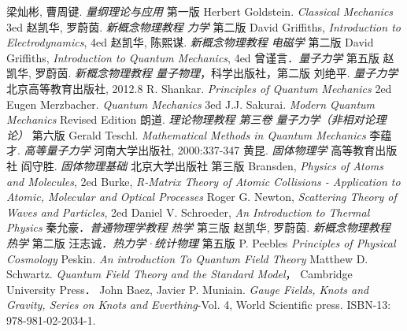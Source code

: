 \begin{thebibliography}{99}
梁灿彬, 曹周键. \textsl{量纲理论与应用} 第一版
Herbert Goldstein. \textsl{Classical Mechanics} 3ed
赵凯华, 罗蔚茵. \textsl{新概念物理教程 力学} 第二版
David Griffiths, \textsl{Introduction to Electrodynamics}, 4ed
赵凯华, 陈熙谋. \textsl{新概念物理教程 电磁学} 第二版
David Griffiths, \textsl{Introduction to Quantum Mechanics}, 4ed
曾谨言．\textsl{量子力学} 第五版
赵凯华, 罗蔚茵. \textsl{新概念物理教程 量子物理}，科学出版社，第二版
刘绝平. \textsl{量子力学} 北京高等教育出版社, 2012.8
R. Shankar. \textsl{Principles of Quantum Mechanics} 2ed
Eugen Merzbacher. \textsl{Quantum  Mechanics} 3ed
J.J. Sakurai. \textsl{Modern Quantum Mechanics} Revised Edition
朗道. \textsl{理论物理教程 第三卷 量子力学（非相对论理论）} 第六版
Gerald Teschl. \textsl{Mathematical Methods in Quantum Mechanics}
李蕴才. \textsl{高等量子力学} 河南大学出版社, 2000:337-347
黄昆. \textsl{固体物理学} 高等教育出版社
阎守胜. \textsl{固体物理基础} 北京大学出版社 第三版
Bransden, \textsl{Physics of Atoms and Molecules}, 2ed
Burke, \textsl{R-Matrix Theory of Atomic Collisions - Application to Atomic, Molecular and Optical Processes}
Roger G. Newton, \textsl{Scattering Theory of Waves and Particles}, 2ed
Daniel V. Schroeder, \textsl{An Introduction to Thermal Physics}
秦允豪．\textsl{普通物理学教程 热学} 第三版
赵凯华, 罗蔚茵. \textsl{新概念物理教程 热学} 第二版
汪志诚．\textsl{热力学·统计物理}  第五版
P. Peebles \textsl{Principles of Physical Cosmology}
Peskin. \textsl{An introduction To Quantum Field Theory}
Matthew D. Schwartz. \textsl{Quantum Field Theory and the Standard Model}， Cambridge University Press．
John Baez, Javier P. Muniain. \textsl{Gauge Fields, Knots and Gravity, Series on Knots and Everthing}-Vol. 4, World Scientific press. ISBN-13: 978-981-02-2034-1. 

\end{thebibliography}
